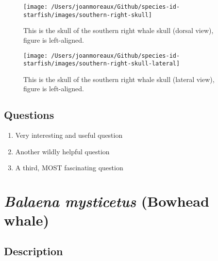\documentclass[]{article}
\providecommand{\tightlist}{%
  \setlength{\itemsep}{0pt}\setlength{\parskip}{0pt}}
\begin{document}
\begin{figure}

\texttt{[image: /Users/joanmoreaux/Github/species-id-starfish/images/southern-right-skull]} \hfill{}

\caption{This is the skull of the southern right whale skull (dorsal view), figure is left-aligned.}\label{fig:southern-right-whale-skull}
\end{figure}

\begin{figure}

\texttt{[image: /Users/joanmoreaux/Github/species-id-starfish/images/southern-right-skull-lateral]} \hfill{}

\caption{This is the skull of the southern right whale skull (lateral view), figure is left-aligned.}\label{fig:southern-right-whale-skull-lateral}
\end{figure}

\newpage

\hypertarget{questions}{%
\subsection{Questions}\label{questions}}

\begin{enumerate}
\def\labelenumi{\arabic{enumi}.}
\tightlist
\item
  Very interesting and useful question
\item
  Another wildly helpful question
\item
  A third, MOST fascinating question
\end{enumerate}

\hypertarget{balaena-mysticetus-bowhead-whale}{%
\section{\texorpdfstring{\emph{Balaena mysticetus} (Bowhead
whale)}{Balaena mysticetus (Bowhead whale)}}\label{balaena-mysticetus-bowhead-whale}}

\hypertarget{description-2}{%
\subsection{Description}\label{description-2}}
\end{document}
